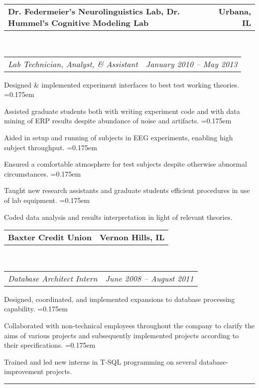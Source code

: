 \documentclass[10pt,letterpaper]{article}
\makeatletter
\newenvironment{indentsection}[1]%
{\begin{list}{}%
	{\setlength{\leftmargin}{#1}}%
	\item[]%
}
{\end{list}}
\newcommand{\headerrow}[2]
{\begin{tabular*}{\linewidth}{l@{\extracolsep{\fill}}r}
	#1 &
	#2 \\
	
\end{tabular*}}
\makeatother
\begin{document}
\begin{indentsection}{\parindent}
	\headerrow
		{\textbf{Dr. Federmeier's Neurolinguistics Lab, Dr. Hummel's Cognitive Modeling Lab}}
		{\textbf{Urbana, IL}}
	\\
	\headerrow
		{\emph{Lab Technician, Analyst, \& Assistant}}
		{\emph{January 2010 -- May 2013}}
	\vspace{-2em}	
	\begin{itemize*}
		\item Designed \& implemented experiment interfaces to best test working theories.
		\parskip=0.175em
		\item Assisted graduate students both with writing experiment code and with data mining of ERP results despite abundance of noise and artifacts.
		\parskip=0.175em
		\item Aided in setup and running of subjects in EEG experiments, enabling high subject throughput.
		\parskip=0.175em
		\item Ensured a comfortable atmosphere for test subjects despite otherwise abnormal circumstances.
		\parskip=0.175em
		\item Taught new research assistants and graduate students efficient procedures in use of lab equipment.
		\parskip=0.175em
		\item Coded data analysis and results interpretation in light of relevant theories.
	\end{itemize*}

	\headerrow
		{\textbf{Baxter Credit Union}}
		{\textbf{Vernon Hills, IL}}
	\\
	\headerrow
		{\emph{Database Architect Intern}}
		{\emph{June 2008 -- August 2011}}
		\vspace{-2em}
	\begin{itemize*}
		\item Designed, coordinated, and implemented expansions to database processing capability.
		\parskip=0.175em
		\item Collaborated with non-technical employees throughout the company to clarify the aims of various projects and subsequently implemented projects according to their specifications.
		\parskip=0.175em
		\item Trained and led new interns in T-SQL programming on several database-improvement projects.
	\end{itemize*}

\end{indentsection}

\vspace{-0.8em}
\hrule
\vspace{-0.5em}
\end{document}
